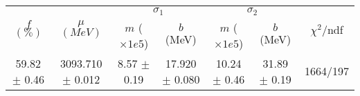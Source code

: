 \begin{tabular}{c|c|cc|cc||c}
 \multirow{2}{*}{$f$ $(\%)$} & \multirow{2}{*}{$\mu$ $(MeV)$} & \multicolumn{2}{|c|}{$\sigma_1$} & \multicolumn{2}{|c||}{$\sigma_2$} & \multirow{2}{*}{$\chi^2/$ndf} \\
 & & $m$ ($\times1e5$) & $b$ (MeV) & $m$ ($\times1e5$) & $b$ (MeV) & \\
\hline
59.82 $\pm$ 0.46 & 3093.710 $\pm$ 0.012 & 8.57 $\pm$ 0.19 & 17.920 $\pm$ 0.080 & 10.24 $\pm$ 0.46 & 31.89 $\pm$ 0.19 & 1664/197\\
\end{tabular}
